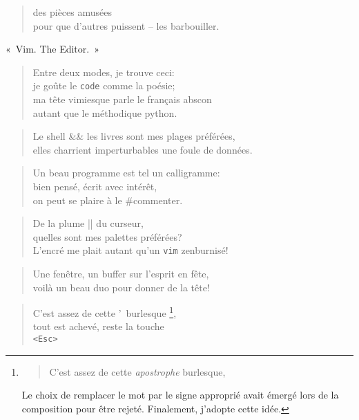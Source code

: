   \begin{verse}
    des pièces amusées\\
    pour que d’autres puissent -- les barbouiller.
  \end{verse}
  \begin{center}
    «~Vim. The Editor.~»    
  \end{center}
  \begin{verse}
    Entre deux modes, je trouve ceci:\\
    je goûte le \texttt{code} comme la poésie;\\
    ma tête vimiesque parle le français abscon\\
    autant que le méthodique python.
  \end{verse}
  \begin{verse}
    Le shell \&\& les livres sont mes plages préférées,\\
    elles charrient imperturbables une foule de données.
  \end{verse}
  \begin{verse}
    Un beau programme est tel un calligramme:\\
    bien pensé, écrit avec intérêt,\\
    on peut se plaire à le \#commenter.
  \end{verse}
  \begin{verse}
    De la plume || du curseur,\\
    quelles sont mes palettes préférées?\\
    L’encré me plait autant qu’un \texttt{vim} zenburnisé!
  \end{verse}
  \begin{verse}
    Une fenêtre, un buffer sur l’esprit en fête,\\
    voilà un beau duo pour donner de la tête!
  \end{verse}
  \begin{verse}
    C’est assez de cette {\Huge ’}~burlesque
    \footnote{
	    \begin{quotation}
	    C’est assez de cette \emph{apostrophe} burlesque,
	    \end{quotation}
	    Le choix de remplacer le mot par le signe approprié avait émergé
	    lors de la composition pour être rejeté. Finalement, j’adopte cette idée.
	    },\\
    tout est achevé, reste la touche\\
    \texttt{<Esc>}
  \end{verse}
